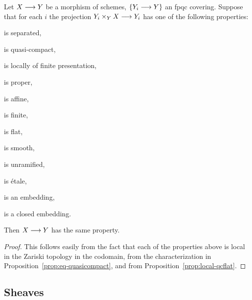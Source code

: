 \begin{2   CONTRAVARIANT FUNCTORS}
\begin{2.3 Sheaves in Grothendieck topologies}
\begin{proposition}\label{prop:local-fpqc}%
%
Let $X \arr Y$ be a morphism of schemes, $\{Y_i \arr Y\}$ an fpqc covering. Suppose that for each $i$ the projection $Y_i \times_{Y} X \arr Y_i$ has one of the following properties:

\begin{enumeratei}

\item is separated,

\item is quasi-compact,

\item is locally of finite presentation,

\item is proper,

\item is affine,

\item is finite,

\item is flat,

\item is smooth, 

\item is unramified,

\item is \'etale,

\item is an embedding,

\item is a closed embedding.

\end{enumeratei}

Then $X \arr Y$ has the same property.
\end{proposition}

\begin{proof}
This follows easily from the fact that each of the properties above is local in the Zariski topology in the codomain, from the characterization  in Proposition~\ref{prop:eq-quasicompact}, and from Proposition~\ref{prop:local-qcflat}.
\end{proof}



\subsection{Sheaves}


\end{2.3 Sheaves in Grothendieck topologies}
\end{2   CONTRAVARIANT FUNCTORS}
